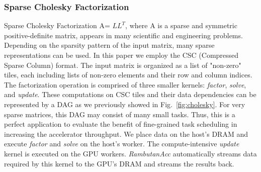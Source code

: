 \subsubsection{Sparse Cholesky Factorization}
Sparse Cholesky Factorization A= $LL^T$, where A is a sparse and symmetric positive-definite matrix,
appears in many scientific and engineering problems.
Depending on the sparsity pattern of the input matrix, many sparse representations can be used.
In this paper we employ the CSC (Compressed Sparse Column) format. 
The input matrix is organized as a list of "non-zero" tiles, each including lists of non-zero elements and their row and column indices.
The factorization operation is comprised of three smaller kernels: {\em factor}, {\em solve}, and {\em update}.
These computations on CSC tiles and their data dependencies can be represented by a DAG as we previously showed in Fig.~\ref{fig:cholesky}. 
For very sparse matrices, this DAG may consist of many small tasks.
Thus, this is a perfect application to evaluate the benefit of fine-grained task scheduling in increasing the accelerator throughput.
We place data on the host's DRAM and execute {\em factor} and {\em solve} on the host's worker.
The compute-intensive {\em update} kernel is executed on the GPU workers.
{\em RambutanAcc} automatically streams data required by this kernel to the GPU's DRAM and streams the results back.

